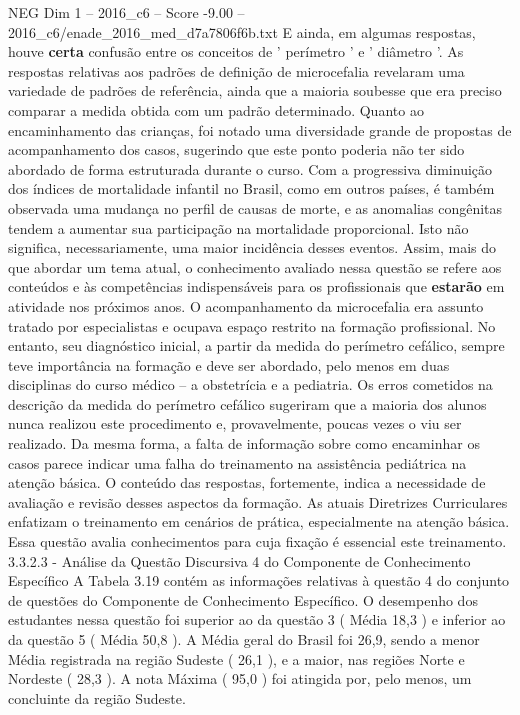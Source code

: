 \begin{textsample}{NEG Dim 1 – 2016\_c6 – Score -9.00 – 2016\_c6/enade\_2016\_med\_d7a7806f6b.txt}
E ainda, em algumas respostas, houve \textbf{certa} confusão entre os conceitos de ' perímetro ' e ' diâmetro '.
As respostas relativas aos padrões de definição de microcefalia revelaram uma variedade de padrões de referência, ainda que a maioria soubesse que era preciso comparar a medida obtida com um padrão determinado.
Quanto ao encaminhamento das crianças, foi notado uma diversidade grande de propostas de acompanhamento dos casos, sugerindo que este ponto poderia não ter sido abordado de forma estruturada durante o curso.
Com a progressiva diminuição dos índices de mortalidade infantil no Brasil, como em outros países, é também observada uma mudança no perfil de causas de morte, e as anomalias congênitas tendem a aumentar sua participação na mortalidade proporcional.
Isto não significa, necessariamente, uma maior incidência desses eventos.
Assim, mais do que abordar um tema atual, o conhecimento avaliado nessa questão se refere aos conteúdos e às competências indispensáveis para os profissionais que \textbf{estarão} em atividade nos próximos anos.
O acompanhamento da microcefalia era assunto tratado por especialistas e ocupava espaço restrito na formação profissional.
No entanto, seu diagnóstico inicial, a partir da medida do perímetro cefálico, sempre teve importância na formação e deve ser abordado, pelo menos em duas disciplinas do curso médico – a obstetrícia e a pediatria.
Os erros cometidos na descrição da medida do perímetro cefálico sugeriram que a maioria dos alunos nunca realizou este procedimento e, provavelmente, poucas vezes o viu ser realizado.
Da mesma forma, a falta de informação sobre como encaminhar os casos parece indicar uma falha do treinamento na assistência pediátrica na atenção básica.
O conteúdo das respostas, fortemente, indica a necessidade de avaliação e revisão desses aspectos da formação.
As atuais Diretrizes Curriculares enfatizam o treinamento em cenários de prática, especialmente na atenção básica.
Essa questão avalia conhecimentos para cuja fixação é essencial este treinamento. 3.3.2.3 - Análise da Questão Discursiva 4 do Componente de Conhecimento Específico A Tabela 3.19 contém as informações relativas à questão 4 do conjunto de questões do Componente de Conhecimento Específico.
O desempenho dos estudantes nessa questão foi superior ao da questão 3 ( Média 18,3 ) e inferior ao da questão 5 ( Média 50,8 ).
A Média geral do Brasil foi 26,9, sendo a menor Média registrada na região Sudeste ( 26,1 ), e a maior, nas regiões Norte e Nordeste ( 28,3 ).
A nota Máxima ( 95,0 ) foi atingida por, pelo menos, um concluinte da região Sudeste.

\end{textsample}
